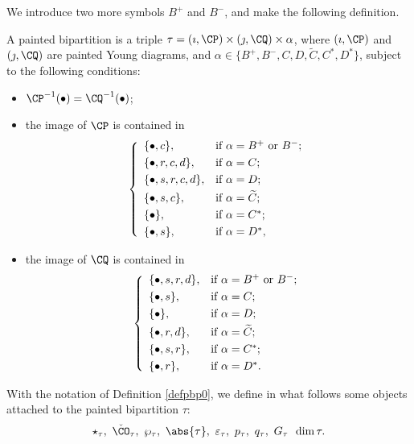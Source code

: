 \documentclass[ssunip.tex]{subfiles}
\begin{document}
 We introduce two more symbols $B^+$ and $B^-$, and make the following definition.
 \begin{defn}\label{defpbp0}
 A painted bipartition is a triple $\tau=(\imath, \CP)\times (\jmath, \CQ)\times \alpha$, where $(\imath, \CP)$ and $ (\jmath, \CQ)$ are painted Young diagrams, and $\alpha\in \{B^+,B^-, C,D,\widetilde {C}, C^*, D^*\}$, subject to the following conditions:
 \begin{itemize}
 \item
 $\CP^{-1}(\bullet)=\CQ^{-1}(\bullet)$;
 \item
 the image of $\CP$ is contained in
 \[
 \left\{
     \begin{array}{ll}
         \{\bullet, c\}, &\hbox{if $\alpha=B^+$ or $B^-$}; \smallskip\\
            \{\bullet,  r, c,d\}, &\hbox{if $\alpha=C$}; \smallskip\\
          \{\bullet, s, r, c,d\}, &\hbox{if $\alpha=D$}; \smallskip\\
            \{\bullet, s, c\}, &\hbox{if $\alpha=\widetilde{ C}$}; \smallskip \\
        \{\bullet\}, &\hbox{if $\alpha=C^*$}; \smallskip \\
          \{\bullet, s\}, &\hbox{if $\alpha=D^*$},\\
            \end{array}
   \right.
 \]
 \item
 the image of $\CQ$ is contained in
 \[
 \left\{
     \begin{array}{ll}
         \{\bullet, s, r, d\}, &\hbox{if $\alpha=B^+$ or $B^-$}; \smallskip\\
           \{\bullet, s\}, &\hbox{if $\alpha=C$}; \smallskip\\
           \{\bullet\}, &\hbox{if $\alpha=D$}; \smallskip\\
             \{\bullet, r, d\}, &\hbox{if $\alpha=\widetilde{ C}$}; \smallskip\\
        \{\bullet, s,r\}, &\hbox{if $\alpha=C^*$}; \smallskip \\
          \{\bullet, r\}, &\hbox{if $\alpha=D^*$}.
            \end{array}
   \right.
 \]


 \end{itemize}


 \end{defn}
 With the notation of Definition \ref{defpbp0}, we define in what follows some objects attached to the painted bipartition $\tau$:
 \[
   \star_\tau, \ \check \CO_\tau, \  \wp_\tau, \  \abs{\tau}, \  \varepsilon_\tau, \  p_\tau, \ q_\tau, \ G_\tau\, \ \dim \tau.
 \]
\end{document}
